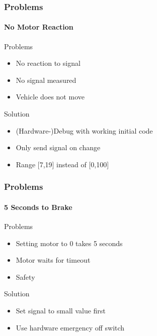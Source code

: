 \documentclass[8pt]{beamer}
\begin{document}
\begin{frame}
	\frametitle{Problems}
	\framesubtitle{No Motor Reaction}
	\begin{block}{Problems}
		\begin{itemize}
			\item No reaction to signal
			\item No signal measured
			\item Vehicle does not move
		\end{itemize}
	\end{block}
	\pause
	\begin{block}{Solution}
		\begin{itemize}[<+->]
			\item (Hardware-)Debug with working initial code
			\item Only send signal on change
			\item Range [7,19] instead of [0,100]
		\end{itemize}
	\end{block}	
\end{frame}

\begin{frame}
	\frametitle{Problems}
	\framesubtitle{5 Seconds to Brake}
	\begin{block}{Problems}
		\begin{itemize}
			\item Setting motor to 0 takes 5 seconds
			\item Motor waits for timeout
			\item Safety
		\end{itemize}
	\end{block}
	\pause
	\begin{block}{Solution}
		\begin{itemize}[<+->]
			\item Set signal to small value first
			\item Use hardware emergency off switch
		\end{itemize}
	\end{block}	
\end{frame}
\end{document}
